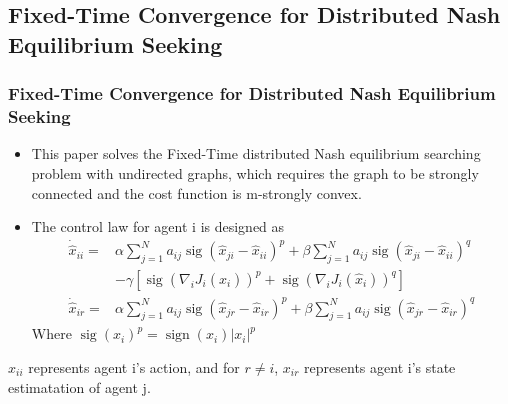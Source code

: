 \subsection[Fixed-Time Convergence for Distributed Nash Equilibrium Seeking]{Fixed-Time Convergence for Distributed Nash Equilibrium Seeking}
\begin{frame}
  \frametitle{\normalsize{Fixed-Time Convergence for Distributed Nash Equilibrium Seeking}}\transwipe
  
  \begin{itemize}\small
    \breference
    \scriptsize
    [5] Z. Li and Z. Ding, "Distributed Nash Equilibrium Searching via Fixed-Time Consensus-Based Algorithms," 2019 American Control Conference (ACC), 2019, pp. 2765-2770,
    \ereference
  \item This paper solves the  \textcolor[rgb]{0.00,0.00,1.00}{Fixed-Time} distributed Nash equilibrium searching problem with undirected graphs, which requires the graph to be \textcolor[rgb]{0.00,0.00,1.00}{strongly connected} and the cost function is \textcolor[rgb]{0.00,0.00,1.00}{m-strongly convex}.
  
  \item The control law for agent i is designed as 
  \begin{equation}
    \begin{aligned}
      \dot{\hat{x}}_{i i}= & \alpha \sum_{j=1}^{N} a_{i j} \operatorname{sig}\left(\hat{x}_{j i}-\hat{x}_{i i}\right)^{p}+\beta \sum_{j=1}^{N} a_{i j} \operatorname{sig}\left(\hat{x}_{j i}-\hat{x}_{i i}\right)^{q} \\
      & -\gamma\left[\operatorname{sig}\left(\nabla_{i} J_{i}\left(\hat{x}_{i}\right)\right)^{p}+\operatorname{sig}\left(\nabla_{i} J_{i}\left(\hat{x}_{i}\right)\right)^{q}\right] \\ 
      \dot{\hat{x}}_{i r}= &\alpha \sum_{j=1}^{N} a_{i j} \operatorname{sig}\left(\hat{x}_{j r}-\hat{x}_{i r}\right)^{p}+\beta \sum_{j=1}^{N} a_{i j} \operatorname{sig}\left(\hat{x}_{j r}-\hat{x}_{i r}\right)^{q}
    \end{aligned}
    \end{equation}
  Where  $\operatorname{sig}\left(x_{i}\right)^{p}=\operatorname{sign}\left(x_{i}\right)\left|x_{i}\right|^{p}$
  \end{itemize}

  \bremark
  $x_{ii}$ represents agent i's action, and for $r \neq i$, $x_{ir}$ represents agent i's state estimatation of agent j. 
  \eremark
  \end{frame}

